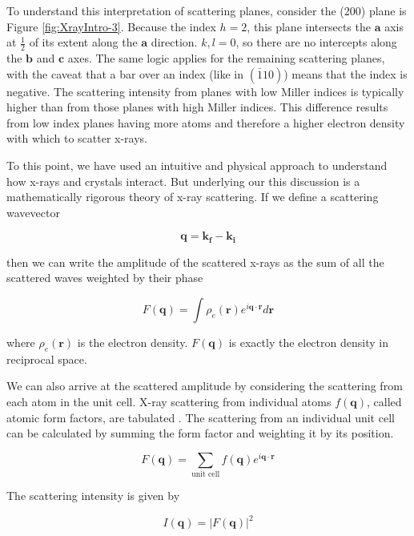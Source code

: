 To understand this interpretation of scattering planes, consider the (200) plane is Figure \ref{fig:XrayIntro-3}. Because the index $h = 2$, this plane intersects the $\mathbf{a}$ axis at $\frac{1}{2}$ of its extent along the $\mathbf{a}$ direction. $k,l = 0$, so there are no intercepts along the $\mathbf{b}$ and $\mathbf{c}$ axes. The same logic applies for the remaining scattering planes, with the caveat that a bar over an index (like in $(\bar{1} 1 0)$) means that the index is negative. The scattering intensity from planes with low Miller indices is typically higher than from those planes with high Miller indices. This difference results from low index planes having more atoms and therefore a higher electron density with which to scatter x-rays.

To this point, we have used an intuitive and physical approach to understand how x-rays and crystals interact. But underlying our this discussion is a mathematically rigorous theory of x-ray scattering. If we define a scattering wavevector

\begin{equation}
\mathbf{q} = \mathbf{k_{f} - k_{i}}
\end{equation}

then we can write the amplitude of the scattered x-rays as the sum of all the scattered waves weighted by their phase

\begin{equation}
F(\mathbf{q}) = \int \rho_{e}(\mathbf{r}) e^{i \mathbf{q} \cdot \mathbf{r}} d\mathbf{r}
\end{equation}

where $\rho_{e}(\mathbf{r})$ is the electron density. $F(\mathbf{q})$ is exactly the electron density in reciprocal space. 

We can also arrive at the scattered amplitude by considering the scattering from each atom in the unit cell. X-ray scattering from individual atoms $f(\mathbf{q})$, called atomic form factors, are tabulated \cite{Henke1993}. The scattering from an individual unit cell can be calculated by summing the form factor and weighting it by its position.

\begin{equation}
F(\mathbf{q}) = \sum_{\text{unit cell}} f(\mathbf{q}) e^{i \mathbf{q} \cdot \mathbf{r}}
\end{equation}

The scattering intensity is given by

\begin{equation}
I(\mathbf{q}) = |F(\mathbf{q})|^{2}
\end{equation}

